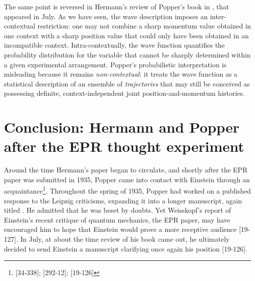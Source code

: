 \documentclass[final,12pt]{article}
\newcommand{\TE}{thought experiment\xspace}
\begin{document}
%
The same point is reversed in Hermann's review of Popper's book in , that appeared in July. As we have seen, the wave description imposes an inter-contextual restriction: one may not combine a sharp momentum value obtained in one context with a sharp position value that could only have been obtained in an incompatible context. Intra-contextually, the wave function quantifies the probability distribution for the variable that cannot be sharply determined within a given experimental arrangement. Popper's probabilistic interpretation is misleading because it remains \emph{non-contextual}: it treats the wave function as a statistical description of an ensemble of \emph{trajectories} that may still be conceived as possessing definite, context-independent joint position-and-momentum histories.

\section{Conclusion: Hermann and Popper after the EPR \TE}
%
Around the time Hermann's paper began to circulate, and shortly after the EPR paper was submitted in 1935, Popper came into contact with Einstein through an acquaintance\footnote{[34-338]; [292-12]; [19-126]}. Throughout the spring of 1935, Popper had worked on a published response to the Leipzig criticisms, expanding it into a longer manuscript, again titled . He admitted that he was beset by doubts. Yet Weisskopf’s report of Einstein’s recent critique of quantum mechanics, the EPR paper, may have encouraged him to hope that Einstein would prove a more receptive audience [19-127]. In July, at about the time  review of his book came out, he ultimately decided to send Einstein a manuscript clarifying once again his position [19-126].
\end{document}
